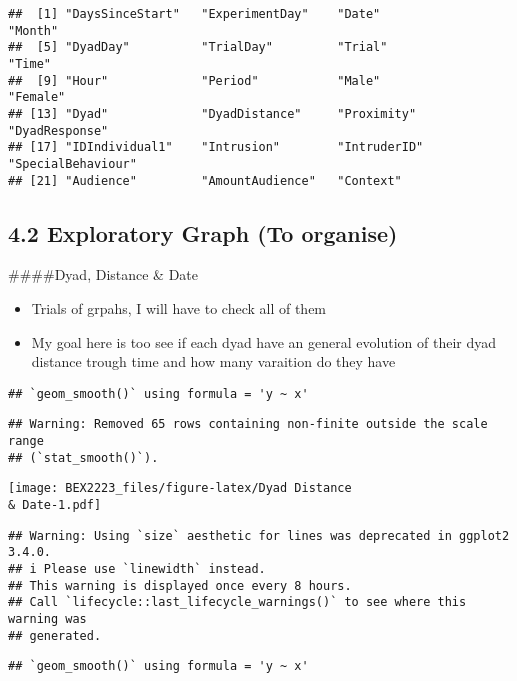 \documentclass[
]{article}
\begin{document}
\begin{verbatim}
##  [1] "DaysSinceStart"   "ExperimentDay"    "Date"             "Month"           
##  [5] "DyadDay"          "TrialDay"         "Trial"            "Time"            
##  [9] "Hour"             "Period"           "Male"             "Female"          
## [13] "Dyad"             "DyadDistance"     "Proximity"        "DyadResponse"    
## [17] "IDIndividual1"    "Intrusion"        "IntruderID"       "SpecialBehaviour"
## [21] "Audience"         "AmountAudience"   "Context"
\end{verbatim}

\hypertarget{exploratory-graph-to-organise}{%
\subsection{4.2 Exploratory Graph (To
organise)}\label{exploratory-graph-to-organise}}

\#\#\#\#Dyad, Distance \& Date

\begin{itemize}
\item
  Trials of grpahs, I will have to check all of them
\item
  My goal here is too see if each dyad have an general evolution of
  their dyad distance trough time and how many varaition do they have
\end{itemize}

\begin{verbatim}
## `geom_smooth()` using formula = 'y ~ x'
\end{verbatim}

\begin{verbatim}
## Warning: Removed 65 rows containing non-finite outside the scale range
## (`stat_smooth()`).
\end{verbatim}

\texttt{[image: BEX2223\_files/figure-latex/Dyad Distance \\\& Date-1.pdf]}

\begin{verbatim}
## Warning: Using `size` aesthetic for lines was deprecated in ggplot2 3.4.0.
## i Please use `linewidth` instead.
## This warning is displayed once every 8 hours.
## Call `lifecycle::last_lifecycle_warnings()` to see where this warning was
## generated.
\end{verbatim}

\begin{verbatim}
## `geom_smooth()` using formula = 'y ~ x'
\end{verbatim}
\end{document}
